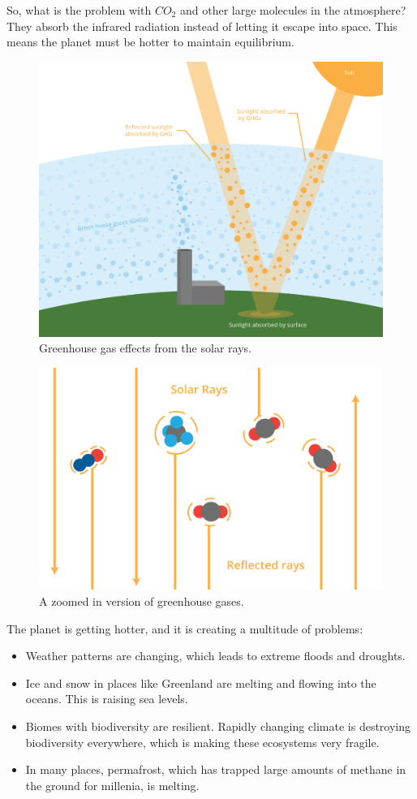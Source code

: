 So, what is the problem with $CO_2$ and other large molecules in the
atmosphere? They absorb the infrared radiation instead of letting it
escape into space. This means the planet must be hotter to maintain
equilibrium.
\begin{figure}[htbp]
    \centering
    \includegraphics[width=1\textwidth]{ghgEffect.png}
    \caption{Greenhouse gas effects from the solar rays.}
    \label{fig:ghgEffect}
\end{figure}
\begin{figure}[htbp]
    \centering
    \includegraphics[width=.5\textwidth]{ghgClose.png}
    \caption{A zoomed in version of greenhouse gases.}
    \label{fig:ghgClose}
\end{figure}

The planet is getting hotter, and it is creating a multitude of
problems:
\begin{itemize}
\item Weather patterns are changing, which leads to extreme floods and
  droughts.
  
\item Ice and snow in places like Greenland are melting and flowing
  into the oceans. This is raising sea levels.
  
\item Biomes with biodiversity are resilient. Rapidly changing climate
  is destroying biodiversity everywhere, which is making these ecosystems
  very fragile.
  
\item In many places, permafrost, which has trapped large amounts of
  methane in the ground for millenia, is melting.
\end{itemize}

